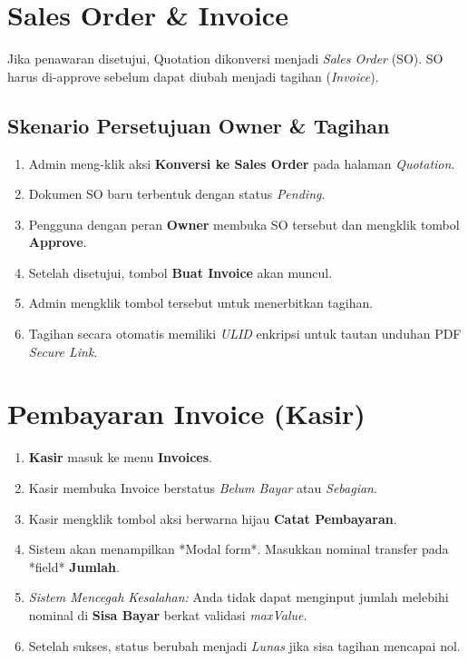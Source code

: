 \section{Sales Order \& Invoice}
Jika penawaran disetujui, Quotation dikonversi menjadi \textit{Sales Order} (SO). SO harus di-approve sebelum dapat diubah menjadi tagihan (\textit{Invoice}).

\subsection{Skenario Persetujuan Owner \& Tagihan}
\begin{enumerate}
    \item Admin meng-klik aksi \textbf{Konversi ke Sales Order} pada halaman \textit{Quotation}.
    \item Dokumen SO baru terbentuk dengan status \textit{Pending}.
    \item Pengguna dengan peran \textbf{Owner} membuka SO tersebut dan mengklik tombol \textbf{Approve}.
    \item Setelah disetujui, tombol \textbf{Buat Invoice} akan muncul.
    \item Admin mengklik tombol tersebut untuk menerbitkan tagihan.
    \item Tagihan secara otomatis memiliki \textit{ULID} enkripsi untuk tautan unduhan PDF \textit{Secure Link}.
\end{enumerate}

\section{Pembayaran Invoice (Kasir)}
\begin{enumerate}
    \item \textbf{Kasir} masuk ke menu \textbf{Invoices}.
    \item Kasir membuka Invoice berstatus \textit{Belum Bayar} atau \textit{Sebagian}.
    \item Kasir mengklik tombol aksi berwarna hijau \textbf{Catat Pembayaran}.
    \item Sistem akan menampilkan *Modal form*. Masukkan nominal transfer pada *field* \textbf{Jumlah}.
    \item \textit{Sistem Mencegah Kesalahan:} Anda tidak dapat menginput jumlah melebihi nominal di \textbf{Sisa Bayar} berkat validasi \textit{maxValue}.
    \item Setelah sukses, status berubah menjadi \textit{Lunas} jika sisa tagihan mencapai nol.
\end{enumerate}

